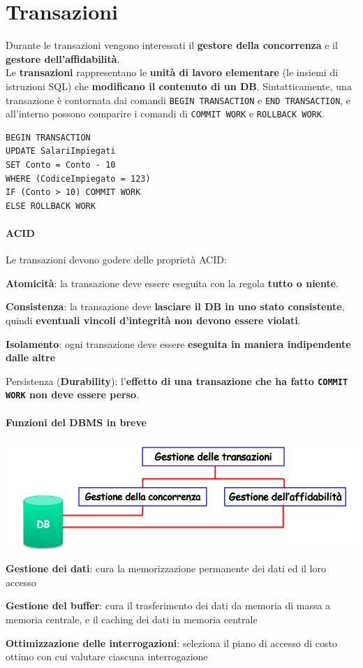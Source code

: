 \documentclass[10pt]{book}
\begin{document}
\section{Transazioni}
Durante le transazioni vengono interessati il \textbf{gestore della concorrenza} e il \textbf{gestore dell'affidabilità}.\\
Le \textbf{transazioni} rappresentano le \textbf{unità di lavoro elementare} (le insiemi di istruzioni SQL) che \textbf{modificano il contenuto di un DB}. Sintatticamente, una transazione è contornata dai comandi \texttt{BEGIN TRANSACTION} e \texttt{END TRANSACTION}, e all'interno possono comparire i comandi di \texttt{COMMIT WORK} e \texttt{ROLLBACK WORK}.
\begin{lstlisting}
BEGIN TRANSACTION
UPDATE SalariImpiegati
SET Conto = Conto - 10
WHERE (CodiceImpiegato = 123)
IF (Conto > 10) COMMIT WORK
ELSE ROLLBACK WORK
\end{lstlisting}
\paragraph{ACID} Le transazioni devono godere delle proprietà ACID:
\begin{list}{}{}
	\item \textbf{Atomicità}: la transazione deve essere eseguita con la regola \textbf{tutto o niente}.
	\item \textbf{Consistenza}: la transazione deve \textbf{lasciare il DB in uno stato consistente}, quindi \textbf{eventuali vincoli d'integrità non devono essere violati}.
	\item \textbf{Isolamento}: ogni transazione deve essere \textbf{eseguita in maniera indipendente dalle altre}
	\item Persistenza (\textbf{Durability}): l'\textbf{effetto di una transazione che ha fatto \texttt{COMMIT WORK} non deve essere perso}.
\end{list}
\paragraph{Funzioni del DBMS in breve}
\begin{center}
	\includegraphics[scale=0.75]{funzdbbreve.png}
\end{center}
\begin{list}{}{}
	\item \textbf{Gestione dei dati}: cura la memorizzazione permanente dei dati ed il loro accesso
	\item \textbf{Gestione del buffer}: cura il trasferimento dei dati da memoria di massa a memoria centrale, e il caching dei dati in memoria centrale
	\item \textbf{Ottimizzazione delle interrogazioni}: seleziona il piano di accesso di costo ottimo con cui valutare ciascuna interrogazione
\end{list}
\pagebreak
\end{document}
